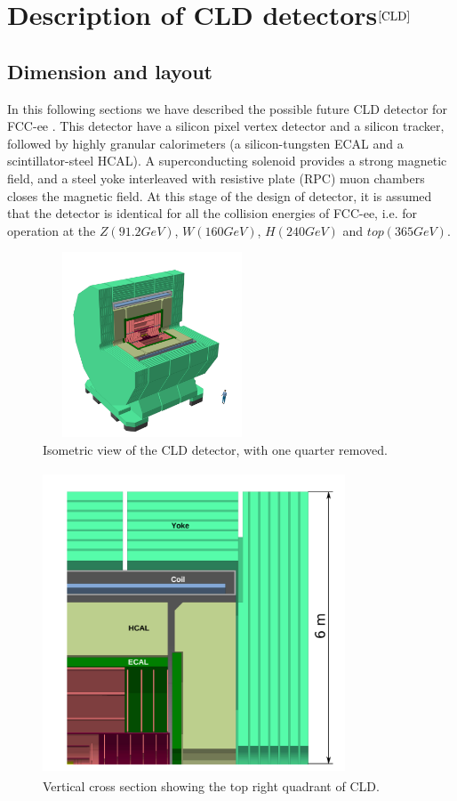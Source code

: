 \chapter{\label{method}Description of CLD detectors$^{\cite{CLD}}$}

\setcounter{equation}{0}
\setcounter{table}{0}
\setcounter{figure}{0}

\baselineskip 20pt
\hspace{10pt}
\section{Dimension and layout}
In this following sections we have described the  possible future  CLD detector for 
FCC-ee \cite{CLD}. This detector  have  a silicon 
pixel vertex detector and a silicon tracker, followed by highly 
granular calorimeters (a silicon-tungsten ECAL and a 
scintillator-steel
HCAL). A superconducting solenoid provides a strong magnetic 
field, and a steel yoke interleaved with
resistive plate (RPC) muon chambers closes the magnetic field.
At this stage of the design of detector, it is assumed that the detector is identical for all the collision energies of FCC-ee, i.e. for operation at the $Z (91.2 GeV)$, $W (160 GeV)$, $H (240 GeV)$ and $top (365 GeV)$.
\begin{figure}
    \centering
    \includegraphics[width = 6.5cm, height = 5.5cm]{fcc_det/ph1.png}
    \caption{Isometric view of the CLD detector, with one quarter removed.}
    \label{fig:detector1}
\end{figure}

\begin{figure}
    \centering
    \includegraphics[width = 9cm, height = 9cm]{fcc_det/ph2.png}
    \caption{Vertical cross section showing the top right quadrant of CLD.}\label{fig:detector2}
\end{figure}

